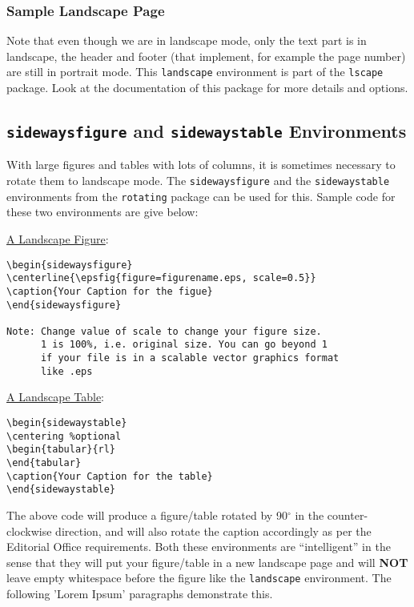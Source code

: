 {\begin{landscape}
\subsubsection{Sample Landscape Page}\label{ps}
Note that even though we are in landscape mode, only the text part is in landscape, the header and footer (that implement, for example the page number) are still in portrait mode. This  \texttt{landscape} environment is part of the  \texttt{lscape} package. Look at the documentation of this package for more details and options.
\end{landscape}


\subsection{\texttt{sidewaysfigure} and \texttt{sidewaystable} Environments}
\label{side}
With large figures and tables with lots of columns, it is sometimes necessary to rotate them to landscape mode. The \texttt{sidewaysfigure} and the \texttt{sidewaystable} environments from the \texttt{rotating} package can be used for this. Sample code for these two environments are give below:

\singlespacing
\noindent \underline{A Landscape Figure}:
\begin{verbatim}
\begin{sidewaysfigure}
\centerline{\epsfig{figure=figurename.eps, scale=0.5}}
\caption{Your Caption for the figue}
\end{sidewaysfigure}

Note: Change value of scale to change your figure size.
      1 is 100%, i.e. original size. You can go beyond 1
      if your file is in a scalable vector graphics format
      like .eps
\end{verbatim}
\doublespacing

\singlespacing
\noindent \underline{A Landscape Table}:
\begin{verbatim}
\begin{sidewaystable}
\centering %optional
\begin{tabular}{rl}
\end{tabular}
\caption{Your Caption for the table}
\end{sidewaystable}
\end{verbatim}
\doublespacing

The above code will produce a figure/table rotated by 90$^\circ$ in the counter-clockwise direction, and will also rotate the caption accordingly as per the Editorial Office requirements. Both these environments are ``intelligent'' in the sense that they will put your figure/table in a new landscape page and will \textbf{NOT} leave empty whitespace before the figure like the \texttt{landscape} environment. The following 'Lorem Ipsum' paragraphs demonstrate this.

}
